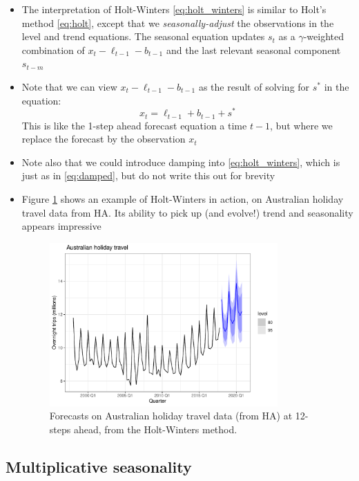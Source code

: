 \documentclass{article}
\begin{document}
\begin{itemize}
\item The interpretation of Holt-Winters \eqref{eq:holt_winters} is similar to 
  Holt's method \eqref{eq:holt}, except that we \emph{seasonally-adjust} the 
  observations in the level and trend equations. The seasonal equation updates
  $s_t$ as a $\gamma$-weighted combination of $x_t - \ell_{t-1} -  b_{t-1}$ and
  the last relevant seasonal component $s_{t-m}$ 

\item Note that we can view $x_t - \ell_{t-1} -  b_{t-1}$ as the result of
  solving for $s^*$ in the equation:       
  \[
  x_t = \ell_{t-1} + b_{t-1} + s^*
  \]
  This is like the 1-step ahead forecast equation a time $t-1$, but where we 
  replace the forecast  by the observation $x_t$   

\item Note also that we could introduce damping into \eqref{eq:holt_winters},
  which is just as in \eqref{eq:damped}, but do not write this out for brevity 

\item Figure \ref{fig:holiday} shows an example of Holt-Winters in action, on 
  Australian holiday travel data from HA. Its ability to pick up (and evolve!)
  trend and seasonality appears impressive

\begin{figure}[htb]
\centering
\includegraphics[width=0.825\textwidth]{fig/holiday-1.pdf}
\caption{Forecasts on Australian holiday travel data (from HA) at 12-steps
  ahead, from the Holt-Winters method.} 
\label{fig:holiday}
\end{figure}
\end{itemize}

\subsection{Multiplicative seasonality}
\end{document}
